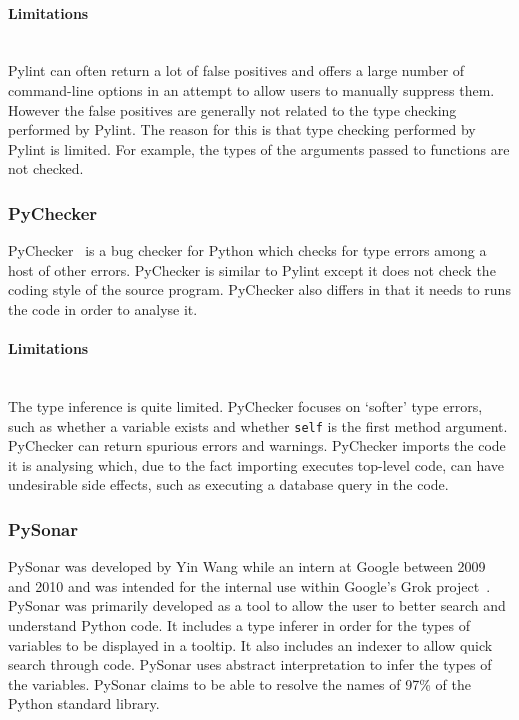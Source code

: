 \documentclass[12pt, titlepage]{article}
\begin{document}
\paragraph{Limitations}\mbox{}\\
Pylint can often return a lot of false positives and offers a large number of command-line options in an attempt to allow users to manually suppress them. However the false positives are generally not related to the type checking performed by Pylint. The reason for this is that type checking performed by Pylint is limited. For example, the types of the arguments passed to functions are not checked.

\subsubsection{PyChecker}
PyChecker~\cite{pychecker} is a bug checker for Python which checks for type errors among a host of other errors. PyChecker is similar to Pylint except it does not check the coding style of the source program. PyChecker also differs in that it needs to runs the code in order to analyse it.
\paragraph{Limitations}\mbox{}\\
The type inference is quite limited. PyChecker focuses on `softer' type errors, such as whether a variable exists and whether \texttt{self} is the first method argument. \\
\indent PyChecker can return spurious errors and warnings. PyChecker imports the code it is analysing which, due to the fact importing executes top-level code, can have undesirable side effects, such as executing a database query in the code. \\


\subsubsection{PySonar}
PySonar was developed by Yin Wang while an intern at Google between 2009 and 2010 and was intended for the internal use within Google's Grok project~\cite{pySonar}. PySonar was primarily developed as a tool to allow the user to better search and understand Python code. It includes a type inferer in order for the types of variables to be displayed in a tooltip. It also includes an indexer to allow quick search through code. PySonar uses abstract interpretation to infer the types of the variables. PySonar claims to be able to resolve the names of 97\% of the Python standard library.
\end{document}
